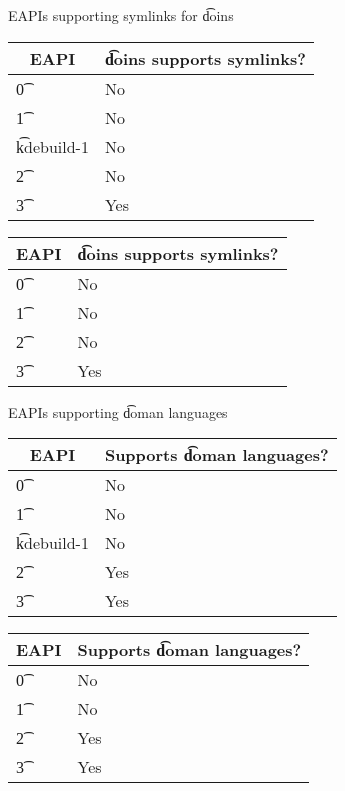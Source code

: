 \begin{centertable}{EAPIs supporting symlinks for \t{doins}} \label{tab:doins-table}
\IFKDEBUILDELSE
{
    \begin{tabular}{ l l }
        \toprule
            \multicolumn{1}{c}{\textbf{EAPI}} &
            \multicolumn{1}{c}{\textbf{\t{doins} supports symlinks?}} \\
            \midrule
    \t{0} & No \\
    \t{1} & No \\
    \t{kdebuild-1} & No \\
    \t{2} & No \\
    \t{3} & Yes \\
    \bottomrule
    \end{tabular}
}{
    \begin{tabular}{ l l }
        \toprule
            \multicolumn{1}{c}{\textbf{EAPI}} &
            \multicolumn{1}{c}{\textbf{\t{doins} supports symlinks?}} \\
            \midrule
    \t{0} & No \\
    \t{1} & No \\
    \t{2} & No \\
    \t{3} & Yes \\
    \bottomrule
    \end{tabular}
}
\end{centertable}

\begin{centertable}{EAPIs supporting \t{doman} languages} \label{tab:doman-table}
\IFKDEBUILDELSE
{
    \begin{tabular}{ l l }
        \toprule
            \multicolumn{1}{c}{\textbf{EAPI}} &
            \multicolumn{1}{c}{\textbf{Supports \t{doman} languages?}} \\
            \midrule
    \t{0} & No \\
    \t{1} & No \\
    \t{kdebuild-1} & No \\
    \t{2} & Yes \\
    \t{3} & Yes \\
    \bottomrule
    \end{tabular}
}{
    \begin{tabular}{ l l }
        \toprule
            \multicolumn{1}{c}{\textbf{EAPI}} &
            \multicolumn{1}{c}{\textbf{Supports \t{doman} languages?}} \\
            \midrule
    \t{0} & No \\
    \t{1} & No \\
    \t{2} & Yes \\
    \t{3} & Yes \\
    \bottomrule
    \end{tabular}
}
\end{centertable}


